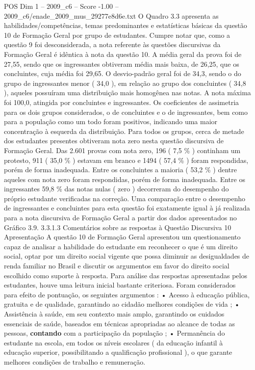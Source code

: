 \begin{textsample}{POS Dim 1 – 2009\_c6 – Score -1.00 – 2009\_c6/enade\_2009\_mus\_29277e8d6e.txt}
O Quadro 3.3 apresenta as habilidades/competências, temas predominantes e estatísticas básicas da questão 10 de Formação Geral por grupo de estudantes.
Cumpre notar que, como a questão 9 foi desconsiderada, a nota referente às questões discursivas da Formação Geral é idêntica à nota da questão 10.
A média geral da prova foi de 27,55, sendo que os ingressantes obtiveram média mais baixa, de 26,25, que os concluintes, cuja média foi 29,65.
O desvio-padrão geral foi de 34,3, sendo o do grupo de ingressantes menor ( 34,0 ), em relação ao grupo dos concluintes ( 34,8 ), aqueles possuíram uma distribuição mais homogênea nas notas.
A nota máxima foi 100,0, atingida por concluintes e ingressantes.
Os coeficientes de assimetria para os dois grupos considerados, o de concluintes e o de ingressantes, bem como para a população como um todo foram positivos, indicando uma maior concentração à esquerda da distribuição.
Para todos os grupos, cerca de metade dos estudantes presentes obtiveram nota zero nesta questão discursiva de Formação Geral.
Das 2.601 provas com nota zero, 196 ( 7,5 \% ) continham um protesto, 911 ( 35,0 \% ) estavam em branco e 1494 ( 57,4 \% ) foram respondidas, porém de forma inadequada.
Entre os concluintes a maioria ( 53,2 \% ) dentre aqueles com nota zero foram respondidas, porém de forma inadequada.
Entre os ingressantes 59,8 \% das notas nulas ( zero ) decorreram do desempenho do próprio estudante verificadas na correção.
Uma comparação entre o desempenho de ingressantes e concluintes para esta questão foi exatamente igual à já realizada para a nota discursiva de Formação Geral a partir dos dados apresentados no Gráfico 3.9. 3.3.1.3 Comentários sobre as respostas à Questão Discursiva 10 Apresentação A questão 10 de Formação Geral apresentou um questionamento capaz de analisar a habilidade do estudante em reconhecer o que é um direito social, optar por um direito social vigente que possa diminuir as desigualdades de renda familiar no Brasil e discutir os argumentos em favor do direito social escolhido como suporte à resposta.
Para análise das respostas apresentadas pelos estudantes, houve uma leitura inicial bastante criteriosa.
Foram considerados para efeito de pontuação, os seguintes argumentos : • Acesso à educação pública, gratuita e de qualidade, garantindo ao cidadão melhores condições de vida ; • Assistência à saúde, em seu contexto mais amplo, garantindo os cuidados essenciais de saúde, baseados em técnicas apropriadas ao alcance de todas as pessoas, \textbf{contando} com a participação da população ; • Permanência do estudante na escola, em todos os níveis escolares ( da educação infantil à educação superior, possibilitando a qualificação profissional ), o que garante melhores condições de trabalho e remuneração.

\end{textsample}
